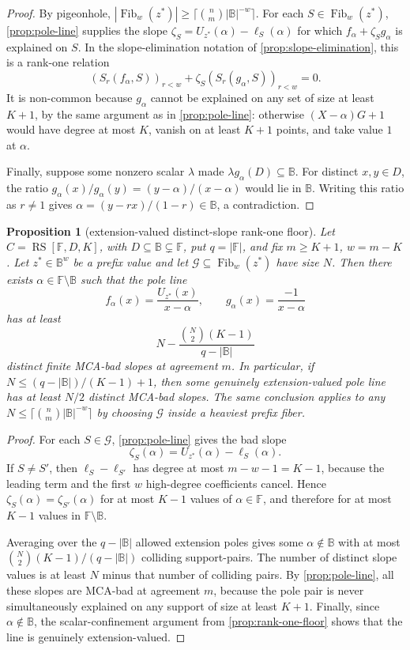 \documentclass[a4paper,11pt]{amsart}
\newtheorem{proposition}[theorem]{Proposition}
\theoremstyle{remark}
\newcommand{\F}{\mathbb F}
\newcommand{\B}{\mathbb B}
\newcommand{\RS}{\operatorname{RS}}
\newcommand{\Fib}{\operatorname{Fib}}
\begin{document}
\begin{proof}
By pigeonhole, \(|\Fib_w(z^*)|\ge\lceil\binom nm|\B|^{-w}\rceil\).  For each \(S\in\Fib_w(z^*)\), \cref{prop:pole-line} supplies the slope \(\zeta_S=U_{z^*}(\alpha)-\ell_S(\alpha)\) for which \(f_\alpha+\zeta_S g_\alpha\) is explained on \(S\).  In the slope-elimination notation of \cref{prop:slope-elimination}, this is a rank-one relation
\[
        (S_r(f_\alpha,S))_{r<w}+\zeta_S(S_r(g_\alpha,S))_{r<w}=0 .
\]
It is non-common because \(g_\alpha\) cannot be explained on any set of size at least \(K+1\), by the same argument as in \cref{prop:pole-line}: otherwise \((X-\alpha)G+1\) would have degree at most \(K\), vanish on at least \(K+1\) points, and take value \(1\) at \(\alpha\).

Finally, suppose some nonzero scalar \(\lambda\) made \(\lambda g_\alpha(D)\subseteq\B\).  For distinct \(x,y\in D\), the ratio \(g_\alpha(x)/g_\alpha(y)=(y-\alpha)/(x-\alpha)\) would lie in \(\B\).  Writing this ratio as \(r\ne1\) gives \(\alpha=(y-rx)/(1-r)\in\B\), a contradiction.
\end{proof}

\begin{proposition}[extension-valued distinct-slope rank-one floor]\label{prop:rank-one-distinct-slope-floor}
Let \(C=\RS[\F,D,K]\), with \(D\subseteq\B\subsetneq\F\), put \(q=|\F|\), and fix \(m\ge K+1\), \(w=m-K\).  Let \(z^*\in\B^w\) be a prefix value and let \(\mathcal G\subseteq\Fib_w(z^*)\) have size \(N\).  Then there exists \(\alpha\in\F\setminus\B\) such that the pole line
\[
        f_\alpha(x)=\frac{U_{z^*}(x)}{x-\alpha},
        \qquad
        g_\alpha(x)=\frac{-1}{x-\alpha}
\]
has at least
\[
        N-\frac{\binom N2 (K-1)}{q-|\B|}
\]
distinct finite MCA-bad slopes at agreement \(m\).  In particular, if \(N\le(q-|\B|)/(K-1)+1\), then some genuinely extension-valued pole line has at least \(N/2\) distinct MCA-bad slopes.  The same conclusion applies to any \(N\le\lceil\binom nm|\B|^{-w}\rceil\) by choosing \(\mathcal G\) inside a heaviest prefix fiber.
\end{proposition}

\begin{proof}
For each \(S\in\mathcal G\), \cref{prop:pole-line} gives the bad slope
\[
        \zeta_S(\alpha)=U_{z^*}(\alpha)-\ell_S(\alpha).
\]
If \(S\ne S'\), then \(\ell_S-\ell_{S'}\) has degree at most \(m-w-1=K-1\), because the leading term and the first \(w\) high-degree coefficients cancel.  Hence \(\zeta_S(\alpha)=\zeta_{S'}(\alpha)\) for at most \(K-1\) values of \(\alpha\in\F\), and therefore for at most \(K-1\) values in \(\F\setminus\B\).

Averaging over the \(q-|\B|\) allowed extension poles gives some \(\alpha\notin\B\) with at most \(\binom N2(K-1)/(q-|\B|)\) colliding support-pairs.  The number of distinct slope values is at least \(N\) minus that number of colliding pairs.  By \cref{prop:pole-line}, all these slopes are MCA-bad at agreement \(m\), because the pole pair is never simultaneously explained on any support of size at least \(K+1\).  Finally, since \(\alpha\notin\B\), the scalar-confinement argument from \cref{prop:rank-one-floor} shows that the line is genuinely extension-valued.
\end{proof}
\end{document}
